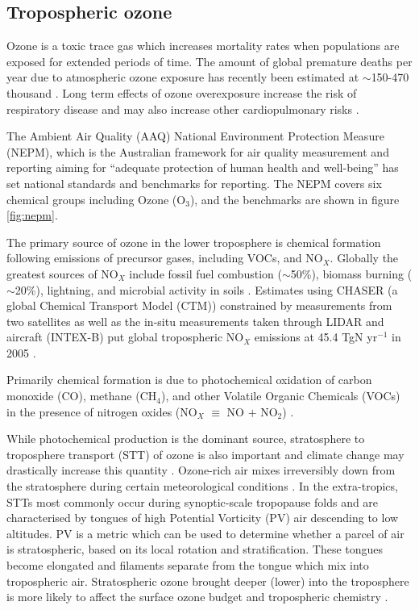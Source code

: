 \subsection{Tropospheric ozone}

Ozone is a toxic trace gas which increases mortality rates when populations are exposed for extended periods of time.
The amount of global premature deaths per year due to atmospheric ozone exposure has recently been estimated at $\sim$150-470 thousand \cite{Silva_2013, Lelieveld_2015}.
Long term effects of ozone overexposure increase the risk of respiratory disease and may also increase other cardiopulmonary risks \cite{Jerrett_2009}.

The Ambient Air Quality (AAQ) National Environment Protection Measure (NEPM), which is the Australian framework for air quality measurement and reporting aiming for ``adequate protection of human health and well-being'' has set national standards and benchmarks for reporting. The NEPM covers six chemical groups including Ozone (O$_3$), and the benchmarks are shown in figure \ref{fig:nepm}.

The primary source of ozone in the lower troposphere is chemical formation following emissions of precursor gases, including VOCs, and NO$_X$.
Globally the greatest sources of NO$_X$ include fossil fuel combustion ($\sim$50\%), biomass burning ($\sim$20\%), lightning, and microbial activity in soils \citep{Delmas_1997}.
Estimates using CHASER (a global Chemical Transport Model (CTM)) constrained by measurements from two satellites as well as the in-situ measurements taken through LIDAR and aircraft (INTEX-B) put global tropospheric NO$_X$ emissions at 45.4 TgN yr$^{-1}$ in 2005 \cite{Miyazaki_2011}.

Primarily chemical formation is due to photochemical oxidation of carbon monoxide (CO), methane (CH$_4$), and other Volatile Organic Chemicals (VOCs) in the presence of nitrogen oxides (NO$_X$ $\equiv$ NO $+$ NO$_2$) \cite{Stevenson_2006}.

While photochemical production is the dominant source, stratosphere to troposphere transport (STT) of ozone is also important and climate change may drastically increase this quantity \cite{Hegglin_2009}.
Ozone-rich air mixes irreversibly down from the stratosphere during certain meteorological conditions \citep{Sprenger2003,Mihalikova2012}.
In the extra-tropics, STTs most commonly occur during synoptic-scale tropopause folds \citep{Sprenger2003} and are characterised by tongues of high Potential Vorticity (PV) air descending to low altitudes.
PV is a metric which can be used to determine whether a parcel of air is stratospheric, based on its local rotation and stratification.
These tongues become elongated and filaments separate from the tongue which mix into tropospheric air.
Stratospheric ozone brought deeper (lower) into the troposphere is more likely to affect the surface ozone budget and tropospheric chemistry \citep{Zanis2003,Langford_2009}.

